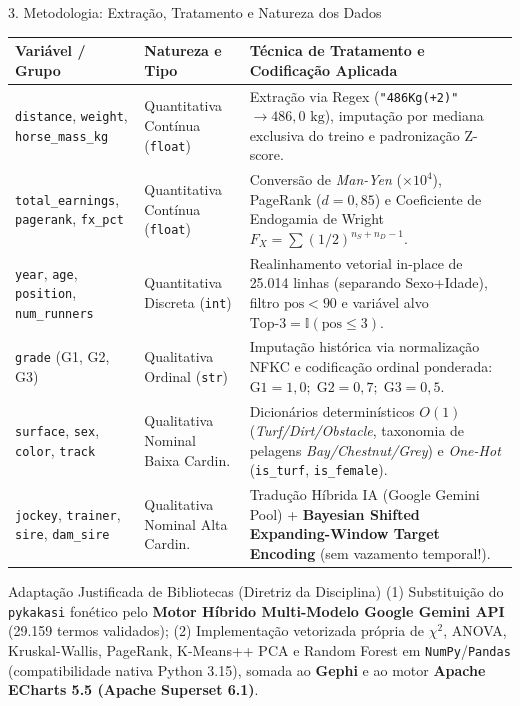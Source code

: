 \documentclass[aspectratio=169,10pt]{beamer}
\begin{document}
\begin{frame}{3. Metodologia: Extração, Tratamento e Natureza dos Dados}
\begin{table}[htbp]
\scriptsize
\renewcommand{\arraystretch}{1.15}
\begin{tabular}{p{2.5cm}p{2.5cm}p{8.2cm}}
\toprule
\textbf{Variável / Grupo} & \textbf{Natureza e Tipo} & \textbf{Técnica de Tratamento e Codificação Aplicada} \\
\midrule
\texttt{distance}, \texttt{weight}, \texttt{horse\_mass\_kg} & Quantitativa Contínua (\texttt{float}) & Extração via Regex (\texttt{"486Kg(+2)"} $\to 486,0\text{ kg}$), imputação por mediana exclusiva do treino e padronização Z-score. \\
\texttt{total\_earnings}, \texttt{pagerank}, \texttt{fx\_pct} & Quantitativa Contínua (\texttt{float}) & Conversão de \textit{Man-Yen} ($\times 10^4$), PageRank ($d=0,85$) e Coeficiente de Endogamia de Wright $F_X = \sum (1/2)^{n_S+n_D-1}$. \\
\texttt{year}, \texttt{age}, \texttt{position}, \texttt{num\_runners} & Quantitativa Discreta (\texttt{int}) & Realinhamento vetorial in-place de 25.014 linhas (separando Sexo+Idade), filtro $\text{pos} < 90$ e variável alvo $\text{Top-3} = \mathbb{I}(\text{pos} \le 3)$. \\
\texttt{grade} (G1, G2, G3) & Qualitativa Ordinal (\texttt{str}) & Imputação histórica via normalização NFKC e codificação ordinal ponderada: $\text{G1}=1,0;\; \text{G2}=0,7;\; \text{G3}=0,5$. \\
\texttt{surface}, \texttt{sex}, \texttt{color}, \texttt{track} & Qualitativa Nominal Baixa Cardin. & Dicionários determinísticos $O(1)$ (\textit{Turf/Dirt/Obstacle}, taxonomia de pelagens \textit{Bay/Chestnut/Grey}) e \textit{One-Hot} (\texttt{is\_turf}, \texttt{is\_female}). \\
\texttt{jockey}, \texttt{trainer}, \texttt{sire}, \texttt{dam\_sire} & Qualitativa Nominal Alta Cardin. & Tradução Híbrida IA (Google Gemini Pool) + \textbf{Bayesian Shifted Expanding-Window Target Encoding} (sem vazamento temporal!). \\
\bottomrule
\end{tabular}
\end{table}
\vspace{-1mm}
\begin{block}{\footnotesize Adaptação Justificada de Bibliotecas (Diretriz da Disciplina)}
\footnotesize
(1) Substituição do \texttt{pykakasi} fonético pelo \textbf{Motor Híbrido Multi-Modelo Google Gemini API} (29.159 termos validados); (2) Implementação vetorizada própria de $\chi^2$, ANOVA, Kruskal-Wallis, PageRank, K-Means++ PCA e Random Forest em \texttt{NumPy}/\texttt{Pandas} (compatibilidade nativa Python 3.15), somada ao \textbf{Gephi} e ao motor \textbf{Apache ECharts 5.5 (Apache Superset 6.1)}.
\end{block}
\end{frame}
\end{document}
